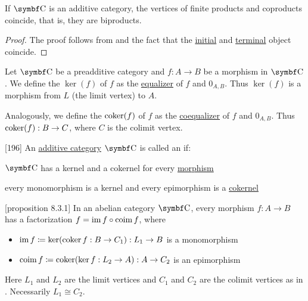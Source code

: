\begin{theorem}\label{thm:additive_category_biproducts}
  If \( \Cat{C} \) is an additive category, the vertices of finite products and coproducts coincide, that is, they are biproducts.
\end{theorem}
\begin{proof}
  The proof follows from  and the fact that the \hyperref[remark:empty_categorical_coproduct]{initial} and \hyperref[remark:empty_categorical_product]{terminal} object coincide.
\end{proof}

\begin{definition}\label{def:categorical_kernel}
  Let \( \Cat{C} \) be a preadditive category and \( f: A \to B \) be a morphism in \( \Cat{C} \). We define the  \( \ker(f) \) of \( f \) as the \hyperref[def:categorical_equalizer]{equalizer} of \( f \) and \( 0_{A,B} \). Thus \( \ker(f) \) is a morphism from \( L \) (the limit vertex) to \( A \).

  Analogously, we define the  \( \operatorname{co}\!\ker(f) \) of \( f \) as the \hyperref[def:categorical_coequalizer]{coequalizer} of \( f \) and \( 0_{A,B} \). Thus \( \operatorname{co}\!\ker(f): B \to C \), where \( C \) is the colimit vertex.
\end{definition}

\begin{definition}\label{def:abelian_category}\cite{MacLane1994}[196]
  An \hyperref[def:additive_category]{additive category} \( \Cat{C} \) is called an  if:
  \begin{defenum}
    \item \( \Cat{C} \) has a kernel and a cokernel for every \hyperref[def:categorical_kernel]{morphism}
    \item every monomorphism is a kernel and every epimorphism is a \hyperref[def:morphism_invertibility]{cokernel}
  \end{defenum}
\end{definition}

\begin{proposition}\label{def:abelian_category_morphism_factorization}\cite{MacLane1994}[proposition 8.3.1]
  In an abelian category \( \Cat{C} \), every morphism \( f: A \to B \) has a factorization \( f = \operatorname{im} f \circ \operatorname{co}\!\operatorname{im} f \), where
  \begin{itemize}
    \item \( \operatorname{im} f \coloneqq \ker(\operatorname{co}\!\ker f: B \to C_1): L_1 \to B \) is a monomorphism
    \item \( \operatorname{co}\!\operatorname{im} f \coloneqq \operatorname{co}\!\ker(\ker f: L_2 \to A): A \to C_2 \) is an epimorphism
  \end{itemize}
  Here \( L_1 \) and \( L_2 \) are the limit vertices and \( C_1 \) and \( C_2 \) are the colimit vertices as in . Necessarily \( L_1 \cong C_2 \).
\end{proposition}

